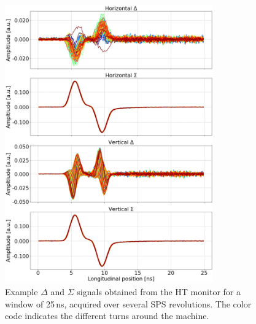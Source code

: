 \begin{figure}[!h]
   \centering         
   \includegraphics[width=0.8\textwidth]{images/Ch4/HT_1D__20180530_135105exampleAcq_4thesis_turnsStart0_Stop6000_step100.png}
       \caption{Example $\Delta$ and $\Sigma$ signals obtained from the HT monitor for a window of 25\,ns, acquired over several SPS revolutions. The color code indicates the different turns around the machine.}
       \label{fig:HT_example_acq_multTurns}
\end{figure}


